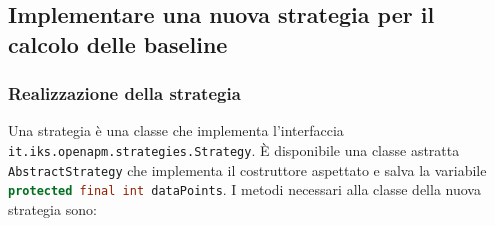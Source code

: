 \subsection[Implementare una nuova strategia]{Implementare una nuova strategia per il calcolo delle baseline}
\label{newstrategy}
	\subsubsection{Realizzazione della strategia}
	
		Una strategia è una classe che implementa l'interfaccia \lstinline{it.iks.openapm.strategies.Strategy}.
		È disponibile una classe astratta \lstinline{AbstractStrategy} che implementa il costruttore aspettato e 
		salva la variabile \lstinline[language=Java]{protected final int dataPoints}.
		I metodi necessari alla classe della nuova strategia sono:
		
